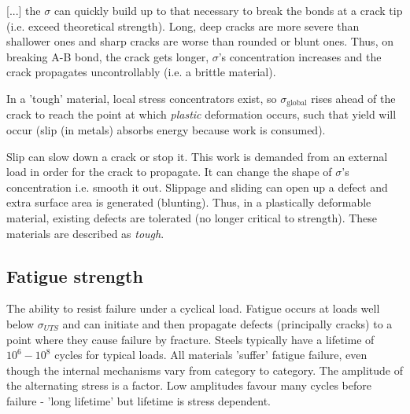 \documentclass[class=report, crop=false, 12pt,a4paper]{standalone}
\begin{document}
[...] the \(\sigma\) can quickly build up to that necessary to break the bonds at a crack tip (i.e. exceed theoretical strength). Long, deep cracks are more severe than shallower ones and sharp cracks are worse than rounded or blunt ones. Thus, on breaking A-B bond, the crack gets longer, \(\sigma\)'s concentration increases and the crack propagates uncontrollably (i.e. a brittle material).

In a 'tough' material, local stress concentrators exist, so \(\sigma_{\textrm{global}}\) rises ahead of the crack to reach the point at which \emph{plastic} deformation occurs, such that yield will occur (slip (in metals) absorbs energy because work is consumed). 

Slip can slow down a crack or stop it. This work is demanded from an external load in order for the crack to propagate. It can change the shape of \(\sigma\)'s concentration i.e. smooth it out. Slippage and sliding can open up a defect and extra surface area is generated (blunting). Thus, in a plastically deformable material, existing defects are tolerated (no longer critical to strength). These materials are described as \emph{tough}.
\subsection{Fatigue strength}
The ability to resist failure under a cyclical load. Fatigue occurs at loads well below \(\sigma_{UTS}\) and can initiate and then propagate defects (principally cracks) to a point where they cause failure by fracture. Steels typically have a lifetime of \(10^6 - 10^8\) cycles for typical loads. All materials 'suffer' fatigue failure, even though the internal mechanisms vary from category to category. The amplitude of the alternating stress is a factor. Low amplitudes favour many cycles before failure - 'long lifetime' but lifetime is stress dependent.
\end{document}
